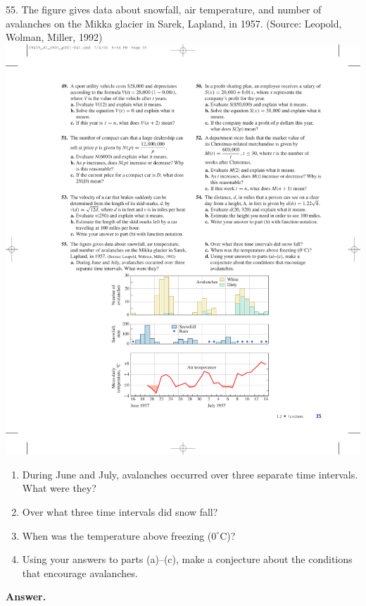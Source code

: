 \documentclass[10pt,]{book}
\theoremstyle{plain}
\theoremstyle{definition}
\theoremstyle{definition}
\theoremstyle{definition}
\theoremstyle{definition}
\numberwithin{equation}{part}
\newcommand\degree[0]{^{\circ}}
\begin{document}
\begin{exerciselist}
\item[55.]\hypertarget{exercise-124}{}The figure gives data about snowfall, air temperature, and number of avalanches on the Mikka glacier in Sarek, Lapland, in 1957. (Source: Leopold, Wolman, Miller, 1992) \includegraphics[width=1\linewidth]{images/fig-ex-1-2-55}
 \leavevmode%
\begin{enumerate}[label=\alph*]
\item\hypertarget{li-480}{}During June and July, avalanches occurred over three separate time intervals. What were they?%
\item\hypertarget{li-481}{}Over what three time intervals did snow fall?%
\item\hypertarget{li-482}{}When was the temperature above freezing (\(0\degree\)C)?%
\item\hypertarget{li-483}{}Using your answers to parts (a)–(c), make a conjecture about the conditions that encourage avalanches.%
\end{enumerate}
%
\par\smallskip
\par\smallskip
\noindent\textbf{Answer.}\hypertarget{answer-71}{}\quad
\leavevmode%
\begin{enumerate}[label=\alph*]

\end{enumerate}
\end{exerciselist}
\end{document}
